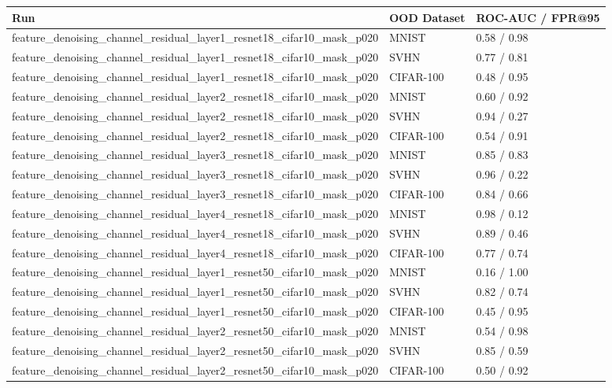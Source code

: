 \begin{tabular}{lll}
\toprule
Run & OOD Dataset & ROC-AUC / FPR@95 \\
\midrule
feature\_denoising\_channel\_residual\_layer1\_resnet18\_cifar10\_mask\_p020 & MNIST & 0.58 / 0.98 \\
feature\_denoising\_channel\_residual\_layer1\_resnet18\_cifar10\_mask\_p020 & SVHN & 0.77 / 0.81 \\
feature\_denoising\_channel\_residual\_layer1\_resnet18\_cifar10\_mask\_p020 & CIFAR-100 & 0.48 / 0.95 \\
feature\_denoising\_channel\_residual\_layer2\_resnet18\_cifar10\_mask\_p020 & MNIST & 0.60 / 0.92 \\
feature\_denoising\_channel\_residual\_layer2\_resnet18\_cifar10\_mask\_p020 & SVHN & 0.94 / 0.27 \\
feature\_denoising\_channel\_residual\_layer2\_resnet18\_cifar10\_mask\_p020 & CIFAR-100 & 0.54 / 0.91 \\
feature\_denoising\_channel\_residual\_layer3\_resnet18\_cifar10\_mask\_p020 & MNIST & 0.85 / 0.83 \\
feature\_denoising\_channel\_residual\_layer3\_resnet18\_cifar10\_mask\_p020 & SVHN & 0.96 / 0.22 \\
feature\_denoising\_channel\_residual\_layer3\_resnet18\_cifar10\_mask\_p020 & CIFAR-100 & 0.84 / 0.66 \\
feature\_denoising\_channel\_residual\_layer4\_resnet18\_cifar10\_mask\_p020 & MNIST & 0.98 / 0.12 \\
feature\_denoising\_channel\_residual\_layer4\_resnet18\_cifar10\_mask\_p020 & SVHN & 0.89 / 0.46 \\
feature\_denoising\_channel\_residual\_layer4\_resnet18\_cifar10\_mask\_p020 & CIFAR-100 & 0.77 / 0.74 \\
feature\_denoising\_channel\_residual\_layer1\_resnet50\_cifar10\_mask\_p020 & MNIST & 0.16 / 1.00 \\
feature\_denoising\_channel\_residual\_layer1\_resnet50\_cifar10\_mask\_p020 & SVHN & 0.82 / 0.74 \\
feature\_denoising\_channel\_residual\_layer1\_resnet50\_cifar10\_mask\_p020 & CIFAR-100 & 0.45 / 0.95 \\
feature\_denoising\_channel\_residual\_layer2\_resnet50\_cifar10\_mask\_p020 & MNIST & 0.54 / 0.98 \\
feature\_denoising\_channel\_residual\_layer2\_resnet50\_cifar10\_mask\_p020 & SVHN & 0.85 / 0.59 \\
feature\_denoising\_channel\_residual\_layer2\_resnet50\_cifar10\_mask\_p020 & CIFAR-100 & 0.50 / 0.92 \\

\end{tabular}

